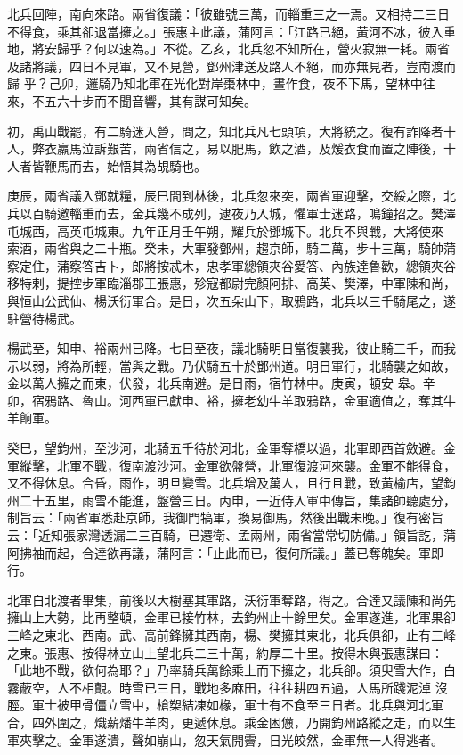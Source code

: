 \begin{pinyinscope}
 北兵回陣，南向來路。兩省復議：「彼雖號三萬，而輜重三之一焉。又相持二三日不得食，乘其卻退當擁之。」張惠主此議，蒲阿言：「江路已絕，黃河不冰，彼入重地，將安歸乎？何以速為。」不從。乙亥，北兵忽不知所在，營火寂無一耗。兩省及諸將議，四日不見軍，又不見營，鄧州津送及路人不絕，而亦無見者，豈南渡而歸
 乎？己卯，邏騎乃知北軍在光化對岸棗林中，晝作食，夜不下馬，望林中往來，不五六十步而不聞音響，其有謀可知矣。



 初，禹山戰罷，有二騎迷入營，問之，知北兵凡七頭項，大將統之。復有詐降者十人，弊衣羸馬泣訴艱苦，兩省信之，易以肥馬，飲之酒，及煖衣食而置之陣後，十人者皆鞭馬而去，始悟其為覘騎也。



 庚辰，兩省議入鄧就糧，辰巳間到林後，北兵忽來突，兩省軍迎擊，交綏之際，北兵以百騎邀輜重而去，金兵幾不成列，逮夜乃入城，懼軍士迷路，鳴鐘招之。樊澤屯城西，高英屯城東。九年正月壬午朔，耀兵於鄧城下。北兵不與戰，大將使來
 索酒，兩省與之二十瓶。癸未，大軍發鄧州，趨京師，騎二萬，步十三萬，騎帥蒲察定住，蒲察答吉卜，郎將按忒木，忠孝軍總領夾谷愛答、內族達魯歡，總領夾谷移特剌，提控步軍臨淄郡王張惠，殄寇都尉完顏阿排、高英、樊澤，中軍陳和尚，與恒山公武仙、楊沃衍軍合。是日，次五朵山下，取鴉路，北兵以三千騎尾之，遂駐營待楊武。



 楊武至，知申、裕兩州已降。七日至夜，議北騎明日當復襲我，彼止騎三千，而我示以弱，將為所輕，當與之戰。乃伏騎五十於鄧州道。明日軍行，北騎襲之如故，金以萬人擁之而東，伏發，北兵南避。是日雨，宿竹林中。庚寅，頓安
 皋。辛卯，宿鴉路、魯山。河西軍已獻申、裕，擁老幼牛羊取鴉路，金軍適值之，奪其牛羊餉軍。



 癸巳，望鈞州，至沙河，北騎五千待於河北，金軍奪橋以過，北軍即西首斂避。金軍縱擊，北軍不戰，復南渡沙河。金軍欲盤營，北軍復渡河來襲。金軍不能得食，又不得休息。合昏，雨作，明旦變雪。北兵增及萬人，且行且戰，致黃榆店，望鈞州二十五里，雨雪不能進，盤營三日。丙申，一近侍入軍中傳旨，集諸帥聽處分，制旨云：「兩省軍悉赴京師，我御門犒軍，換易御馬，然後出戰未晚。」復有密旨云：「近知張家灣透漏二三百騎，已遷衛、孟兩州，兩省當常切防備。」領旨訖，蒲
 阿拂袖而起，合達欲再議，蒲阿言：「止此而已，復何所議。」蓋已奪魄矣。軍即行。



 北軍自北渡者畢集，前後以大樹塞其軍路，沃衍軍奪路，得之。合達又議陳和尚先擁山上大勢，比再整頓，金軍已接竹林，去鈞州止十餘里矣。金軍遂進，北軍果卻三峰之東北、西南。武、高前鋒擁其西南，楊、樊擁其東北，北兵俱卻，止有三峰之東。張惠、按得林立山上望北兵二三十萬，約厚二十里。按得木與張惠謀曰：「此地不戰，欲何為耶？」乃率騎兵萬餘乘上而下擁之，北兵卻。須臾雪大作，白霧蔽空，人不相覿。時雪已三日，戰地多麻田，往往耕四五過，人馬所踐泥淖
 沒脛。軍士被甲骨僵立雪中，槍槊結凍如椽，軍士有不食至三日者。北兵與河北軍合，四外圍之，熾薪燔牛羊肉，更遞休息。乘金困憊，乃開鈞州路縱之走，而以生軍夾擊之。金軍遂潰，聲如崩山，忽天氣開霽，日光皎然，金軍無一人得逃者。




\end{pinyinscope}
